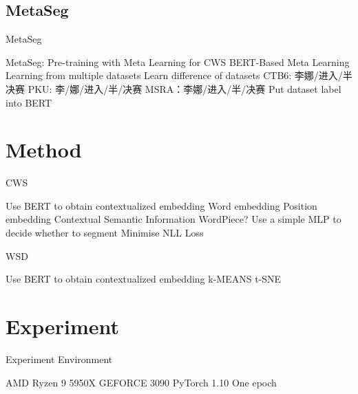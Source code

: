 \documentclass[aspectratio=169]{ctexbeamer}
\begin{document}
\subsection{MetaSeg}
\begin{frame}{MetaSeg}
    \begin{outline}
        \1 MetaSeg\cite{kePretrainingMetaLearning2021}: Pre-training with Meta Learning for CWS
        \1 BERT-Based
        \1 Meta Learning
            \2 Learning from multiple datasets
            \2 Learn difference of datasets
                \3 CTB6: 李娜/进入/半决赛
                \3 PKU: 李/娜/进入/半/决赛
                \3 MSRA：李娜/进入/半/决赛
            \2 Put dataset label into BERT
    \end{outline}
\end{frame}
\section{Method}
\begin{frame}{CWS}
    \begin{outline}
        \1 Use BERT to obtain contextualized embedding
            \2 Word embedding
            \2 Position embedding
            \2 Contextual Semantic Information
        \1 WordPiece?
        \1 Use a simple MLP to decide whether to segment
        \1 Minimise NLL Loss
    \end{outline}
\end{frame}
\begin{frame}{WSD}
    \begin{outline}
        \1 Use BERT to obtain contextualized embedding
        \1 k-MEANS
        \1 t-SNE
    \end{outline}
\end{frame}

\section{Experiment}

\begin{frame}{Experiment Environment}
    \begin{outline}
        \1 AMD Ryzen 9 5950X
        \1 GEFORCE 3090
        \1 PyTorch 1.10
        \1 One epoch
    \end{outline}
\end{frame}
\end{document}
